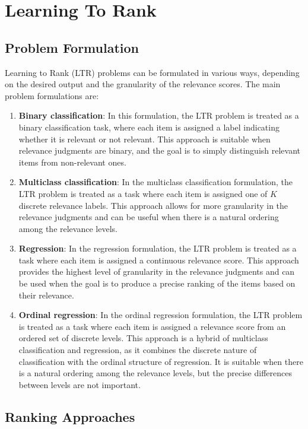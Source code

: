 \documentclass[12pt]{article}
\begin{document}
\section{Learning To Rank}

\subsection{Problem Formulation}

Learning to Rank (LTR) problems can be formulated in various ways, depending on the desired output and the granularity of the relevance scores. The main problem formulations are:

\begin{enumerate}
\item {\textbf{Binary classification}: In this formulation, the LTR problem is treated as a binary classification task, where each item is assigned a label indicating whether it is relevant or not relevant. This approach is suitable when relevance judgments are binary, and the goal is to simply distinguish relevant items from non-relevant ones.
}
\item \textbf{Multiclass classification}: In the multiclass classification formulation, the LTR problem is treated as a task where each item is assigned one of $K$ discrete relevance labels. This approach allows for more granularity in the relevance judgments and can be useful when there is a natural ordering among the relevance levels.

\item \textbf{Regression}: In the regression formulation, the LTR problem is treated as a task where each item is assigned a continuous relevance score. This approach provides the highest level of granularity in the relevance judgments and can be used when the goal is to produce a precise ranking of the items based on their relevance.

\item \textbf{Ordinal regression}: In the ordinal regression formulation, the LTR problem is treated as a task where each item is assigned a relevance score from an ordered set of discrete levels. This approach is a hybrid of multiclass classification and regression, as it combines the discrete nature of classification with the ordinal structure of regression. It is suitable when there is a natural ordering among the relevance levels, but the precise differences between levels are not important.
\end{enumerate}
\subsection{Ranking Approaches}
\end{document}
